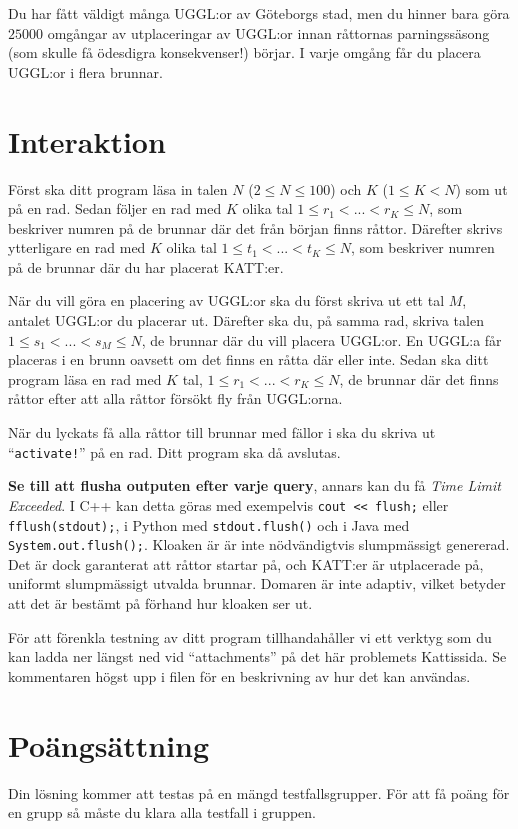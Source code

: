 Du har fått väldigt många UGGL:or av Göteborgs stad, men du hinner bara göra $25000$ omgångar av utplaceringar av UGGL:or innan 
råttornas parningssäsong (som skulle få ödesdigra konsekvenser!) börjar. I varje omgång får du placera UGGL:or i flera brunnar.


\section*{Interaktion}
Först ska ditt program läsa in talen $N$ ($2 \leq N \leq 100$) och $K$ ($1 \leq K < N$) som ut på en rad.
Sedan följer en rad med $K$ olika tal $1 \leq r_1 < ... < r_K \leq N$, som beskriver numren på de brunnar där det från början finns råttor.
Därefter skrivs ytterligare en rad med $K$ olika tal $1 \leq t_1 < ... < t_K \leq N$, som beskriver numren på de brunnar där du har placerat KATT:er.

När du vill göra en placering av UGGL:or ska du först skriva ut ett tal $M$, antalet UGGL:or du placerar ut. 
Därefter ska du, på samma rad, skriva talen $1 \leq s_1 < ... < s_M \leq N$,
de brunnar där du vill placera UGGL:or. En UGGL:a får placeras i en brunn oavsett om det finns en råtta där eller inte.
Sedan ska ditt program läsa en rad med $K$ tal, $1 \leq r_1 < ... < r_K \leq N$, 
de brunnar där det finns råttor efter att alla råttor försökt fly från UGGL:orna.

När du lyckats få alla råttor till brunnar med fällor i ska du skriva ut ``\texttt{activate!}'' på en rad. 
Ditt program ska då avslutas.

\textbf{Se till att flusha outputen efter varje query}, annars kan du få \textit{Time Limit Exceeded}.
I C++ kan detta göras med exempelvis \texttt{cout << flush;}
eller \texttt{fflush(stdout);},
i Python med \texttt{stdout.flush()}
och i Java med \texttt{System.out.flush();}.
Kloaken är är inte nödvändigtvis slumpmässigt genererad. 
Det är dock garanterat att råttor startar på, och KATT:er är utplacerade på, uniformt slumpmässigt utvalda brunnar. 
Domaren är inte adaptiv, vilket betyder att det är bestämt på förhand hur kloaken ser ut.

För att förenkla testning av ditt program tillhandahåller vi ett verktyg som du kan ladda ner längst ned
vid ``attachments'' på det här problemets Kattissida. Se kommentaren högst upp i filen för en beskrivning av hur det kan användas.

\section*{Poängsättning}
Din lösning kommer att testas på en mängd testfallsgrupper.
För att få poäng för en grupp så måste du klara alla testfall i gruppen.

